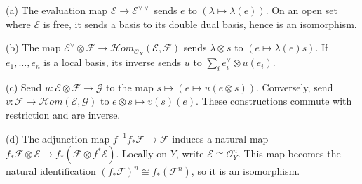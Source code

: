 (a) The evaluation map $\mathcal E\to\mathcal E^{\vee\vee}$ sends $e$ to $(\lambda\mapsto\lambda(e))$. On an open set where $\mathcal E$ is free, it sends a basis to its double dual basis, hence is an isomorphism.

(b) The map $\mathcal E^\vee\otimes\mathcal F\to\mathcal Hom_{\mathcal O_X}(\mathcal E,\mathcal F)$ sends $\lambda\otimes s$ to $(e\mapsto\lambda(e)s)$. If $e_1,\ldots,e_n$ is a local basis, its inverse sends $u$ to $\sum_i e_i^\vee\otimes u(e_i)$.

(c) Send $u:\mathcal E\otimes\mathcal F\to\mathcal G$ to the map $s\mapsto(e\mapsto u(e\otimes s))$. Conversely, send $v:\mathcal F\to\mathcal Hom(\mathcal E,\mathcal G)$ to $e\otimes s\mapsto v(s)(e)$. These constructions commute with restriction and are inverse.

(d) The adjunction map $f^{-1}f_*\mathcal F\to\mathcal F$ induces a natural map $f_*\mathcal F\otimes\mathcal E\to f_*(\mathcal F\otimes f^*\mathcal E)$. Locally on $Y$, write $\mathcal E\cong\mathcal O_Y^n$. This map becomes the natural identification $(f_*\mathcal F)^n\cong f_*(\mathcal F^n)$, so it is an isomorphism.

